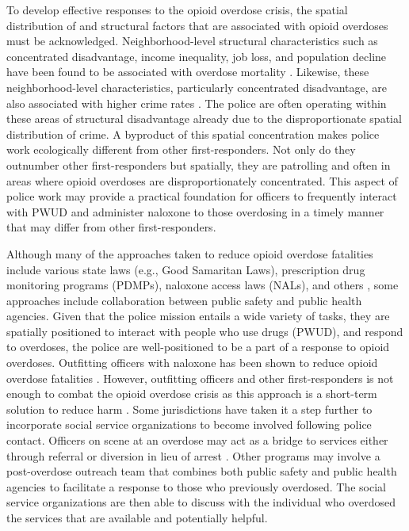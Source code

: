 To develop effective responses to the opioid overdose crisis, the spatial distribution of and structural factors that are associated with opioid overdoses must be acknowledged. Neighborhood-level structural characteristics such as concentrated disadvantage, income inequality, job loss, and population decline have been found to be associated with overdose mortality \parencite{carter_spatial_2019, feldmeyer_community_2022, ford_neighborhood_2017, piza_drug_2023}. Likewise, these neighborhood-level characteristics, particularly concentrated disadvantage, are also associated with higher crime rates \parencite{peterson_divergent_2010}. The police are often operating within these areas of structural disadvantage already due to the disproportionate spatial distribution of crime. A byproduct of this spatial concentration makes police work ecologically different from other first-responders. Not only do they outnumber other first-responders \parencite{lurigio_opioid_2018} but spatially, they are patrolling and often in areas where opioid overdoses are disproportionately concentrated. This aspect of police work may provide a practical foundation for officers to frequently interact with PWUD and administer naloxone to those overdosing in a timely manner that may differ from other first-responders.

Although many of the approaches taken to reduce opioid overdose fatalities include various state laws (e.g., Good Samaritan Laws), prescription drug monitoring programs (PDMPs), naloxone access laws (NALs), and others \parencite{haegerich_evidence_2019}, some approaches include collaboration between public safety and public health agencies. Given that the police mission entails a wide variety of tasks, they are spatially positioned to interact with people who use drugs (PWUD), and respond to overdoses, the police are well-positioned to be a part of a response to opioid overdoses. Outfitting officers with naloxone has been shown to reduce opioid overdose fatalities \parencite{rando_intranasal_2015}. However, outfitting officers and other first-responders is not enough to combat the opioid overdose crisis as this approach is a short-term solution to reduce harm \parencite{goodison_law_2019}. Some jurisdictions have taken it a step further to incorporate social service organizations to become involved following police contact. Officers on scene at an overdose may act as a bridge to services either through referral or diversion in lieu of arrest \parencite{collins_seattles_2017, paul_meeting_2018}. Other programs may involve a post-overdose outreach team that combines both public safety and public health agencies to facilitate a response to those who previously overdosed. The social service organizations are then able to discuss with the individual who overdosed the services that are available and potentially helpful. 

